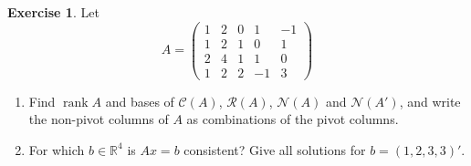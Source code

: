 \documentclass[12pt]{article}
\newcommand{\R}{\mathbb R}
\DeclareMathOperator{\rank}{rank}
\theoremstyle{definition}
\newtheorem{exercise}{Exercise}
\begin{document}
\begin{exercise}\label{ex:r4-four-subspaces-drill}
Let
\[
A=\begin{pmatrix}1&2&0&1&-1\\1&2&1&0&1\\2&4&1&1&0\\1&2&2&-1&3\end{pmatrix}
\]
\begin{enumerate}
\item Find \(\rank A\) and bases of \(\mathcal C(A)\), \(\mathcal R(A)\), \(\mathcal N(A)\) and
\(\mathcal N(A')\), and write the non-pivot columns of \(A\) as combinations of the pivot columns.
\item For which \(b\in\R^4\) is \(Ax=b\) consistent? Give all solutions for \(b=(1,2,3,3)'\).
\end{enumerate}
\end{exercise}
\end{document}
